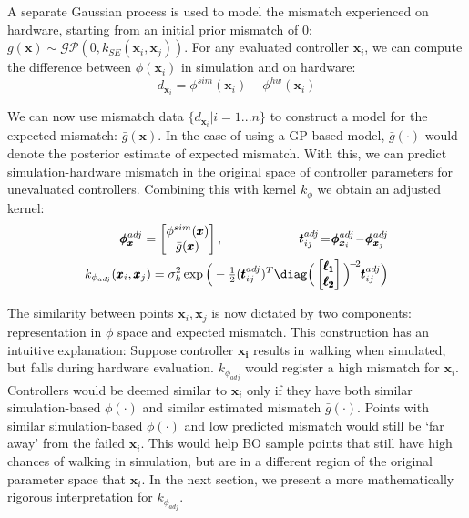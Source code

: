 A separate Gaussian process is used to model the mismatch experienced on hardware, starting from an initial prior mismatch of 0: $g(\pmb{x})\!\sim\!\mathcal{GP}(0, k_{SE}(\pmb{x}_i,\pmb{x}_j))$.
For any evaluated controller $\pmb{x}_i$, we can compute the difference between $\phi(\pmb{x}_i)$ in simulation and on hardware: 
\begin{equation}
    d_{\pmb{x}_i}\!=\!\phi^{sim}(\pmb{x}_i) \!-\! \phi^{hw}(\pmb{x}_i)    
\end{equation}
 
We can now use mismatch data $\{ d_{\pmb{x}_i} | i=1...n \}$ to construct a model for the expected mismatch: $\bar{g}(\pmb{x})$. In the case of using a GP-based model, $\bar{g}(\cdot)$ would denote the posterior estimate of expected mismatch. With this, we can predict simulation-hardware mismatch in the original space of controller parameters for unevaluated controllers. Combining this with kernel $k_{\phi}$ we obtain an adjusted kernel:
\begin{align}
\label{eq:k_adj}
\begin{split}
    \pmb{\phi}^{adj}_{\pmb{x}} = \begin{bmatrix} \phi^{sim}(\pmb{x}) \\ \bar{g}(\pmb{x}) \end{bmatrix}, \quad \quad \quad \quad \quad \quad 
    \pmb{t}_{ij}^{adj} \!=\! \pmb{\phi}^{adj}_{\pmb{x}_i} \!-\! \pmb{\phi}^{adj}_{\pmb{x}_j} \\
    k_{\phi_{adj}}(\pmb{x}_i, \pmb{x}_j) = \sigma_k^2 \exp\Big(- \tfrac{1}{2} (\pmb{t}_{ij}^{adj})^T \diag\Big(\begin{bmatrix}\pmb{\ell_1} \\ \pmb{\ell_2} \end{bmatrix}\Big)^{\!-\!2} \pmb{t}_{ij}^{adj} \Big) \\
\end{split}
\end{align}

The similarity between points $\pmb{x}_i, \pmb{x}_j$ is now dictated by two components: representation in $\phi$ space and expected mismatch. This construction has an intuitive explanation: Suppose controller $\pmb{x_i}$ results in walking when simulated, but falls during hardware evaluation. $k_{\phi_{adj}}$ would register a high mismatch for $\pmb{x}_i$. Controllers would be deemed similar to $\pmb{x}_i$ only if they have both similar simulation-based $\phi(\cdot)$ and similar estimated mismatch $\bar{g}(\cdot)$. Points with similar simulation-based $\phi(\cdot)$ and low predicted mismatch would still be `far away' from the failed $\pmb{x}_i$. This would help BO sample points that still have high chances of walking in simulation, but are in a different region of the original parameter space that $\pmb{x}_i$. In the next section, we present a more mathematically rigorous interpretation for $k_{\phi_{adj}}$.




